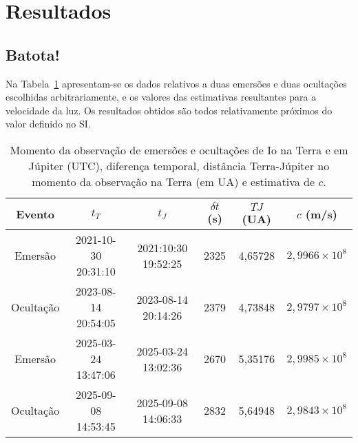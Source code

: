 \documentclass[]{article}
\begin{document}
\section{Resultados}
\subsection{Batota!}
Na Tabela~\ref{tab:aa} apresentam-se os dados relativos a duas emersões e duas
ocultações escolhidas arbitrariamente, e os valores das estimativas resultantes
para a velocidade da luz.  Os resultados obtidos são todos relativamente
próximos do valor definido no SI.
\begin{table}[htb]
  \begin{center}
    \begin{tabular}{cccccc}
      \hline
      Evento & $t_T$ & $t_J$ & $\delta t$ (s) & $\overline{TJ}$ (UA) & $c$ (m/s) \\
      \hline
      Emersão  & 2021-10-30 20:31:10 & 2021:10:30 19:52:25 & 2325 & 4,65728 & $2,9966\times10^8$\\
      Ocultação& 2023-08-14 20:54:05 & 2023-08-14 20:14:26 & 2379 & 4,73848 & $2,9797\times10^8$\\
      Emersão  & 2025-03-24 13:47:06 & 2025-03-24 13:02:36 & 2670 & 5,35176 & $2,9985\times10^8$\\
      Ocultação& 2025-09-08 14:53:45 & 2025-09-08 14:06:33 & 2832 & 5,64948 & $2,9843\times10^8$\\
      \hline
    \end{tabular}
  \end{center}
  \caption{\label{tab:aa}Momento da observação de emersões e ocultações de Io na
  Terra e em Júpiter (UTC), diferença temporal, distância Terra-Júpiter no
momento da observação na Terra (em UA) e estimativa de $c$.}
\end{table}
\end{document}
